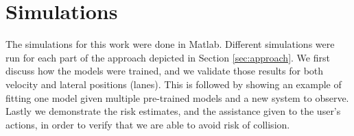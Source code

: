 \documentclass[letterpaper, 10 pt, conference]{ieeeconf}  %
\newcommand\RP[1]{$\clubsuit$\footnote{RP: #1}}
\begin{document}



\section{Simulations} \label{sec:sims}
The simulations for this work were done in Matlab. Different simulations were run for each part of the approach depicted in Section \ref{sec:approach}. We first discuss how the models were trained, and we validate those results for both velocity and lateral positions (lanes). This is followed by showing an example of fitting one model given multiple pre-trained models and a new system to observe. Lastly we demonstrate the risk estimates, and the assistance given to the user's actions, in order to verify that we are able to avoid risk of collision.
\end{document}
